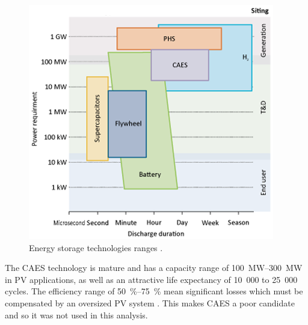 \begin{figure}[htbp]  
\centering
\includegraphics[width=0.6\linewidth]{FIG/EEStechnologies}
\caption[Energy storage technologies ranges.]{Energy storage technologies ranges \cite{IEA2014c}.}\label{EEStechnologies}
\end{figure}

The \ac{CAES} technology is mature and has a capacity range of \SIrange{100}{300}{\mega\watt} in \ac{PV} applications, as well as an attractive life expectancy of 10~000 to 25~000 cycles. The efficiency range of \SIrange{50}{75}{\percent} mean significant losses which must be compensated by an oversized PV system \cite{IEA2014c}. This makes \ac{CAES} a poor candidate and so it was not used in this analysis.


